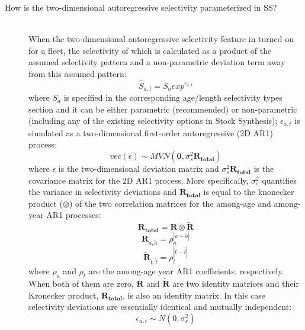 \begin{description}
	\item[How is the two-dimensional autoregressive selectivity parameterized in SS?]\hfil\\
	When the two-dimensional autoregressive selectivity feature in turned on for a fleet, the selectivity of which is calculated as a product of the assumed selectivity pattern and a non-parametric deviation term away from this assumed pattern:
	\begin{equation}
		\hat{S}_{a,t} = S_aexp^{\epsilon_{a,t}}
	\end{equation}
	where $S_a$ is specified in the corresponding age/length selectivity types section and it can be either parametric (recommended) or non-parametric (including any of the existing selectivity options in Stock Synthesis); $\epsilon_{a,t}$ is simulated as a two-dimensional first-order autoregressive (2D AR1) process:
	\begin{equation}
		vec(\epsilon) \sim MVN(\mathbf{0},\sigma_s^2\mathbf{R_{total}})
	\end{equation}
	where $\epsilon$ is the two-dimensional deviation matrix and $\sigma_s^2\mathbf{R_{total}}$ is the covariance matrix for the 2D AR1 process. More specifically, $\sigma_s^2$ quantifies the variance in selectivity deviations and $\mathbf{R_{total}}$ is equal to the knonecker product ($\otimes$) of the two correlation matrices for the among-age and among-year AR1 processes:
	\begin{equation}
		\mathbf{R_{total}}=\mathbf{R}\otimes\mathbf{\tilde{R}}
	\end{equation}
	\begin{equation}
	\mathbf{R}_{a,\tilde{a}}=\rho_a^{|a-\tilde{a}|}
	\end{equation}
	\begin{equation}
	\mathbf{\tilde{R}}_{t,\tilde{t}}=\rho_t^{|t-\tilde{t}|}
	\end{equation}
	where $\rho_a$ and $\rho_t$ are the among-age year AR1 coefficients, respectively. When both of them are zero, $\mathbf{R}$ and $\mathbf{\tilde{R}}$ are two identity matrices and their Kronecker product, $\mathbf{R_{total}}$, is also an identity matrix. In this case selectivity deviations are essentially identical and mutually independent:
	\begin{equation}
		\epsilon_{a,t}\sim N(0,\sigma_s^2)
	\end{equation} 
\end{description}

